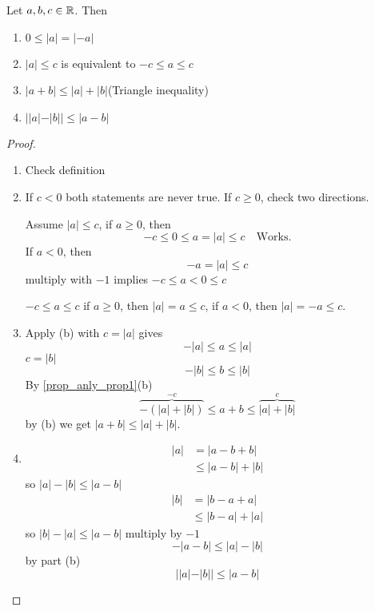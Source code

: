 \documentclass[10pt, a4paper]{article}
\begin{document}
\begin{proposition}\label{prop_anly_prop2}
    Let $a, b, c \in \mathbb{R}$. Then
    \begin{enumerate}[label = (\alph*)]
        \item $0 \leq |a| = |-a|$
        \item $|a| \leq c$ is equivalent to $-c \leq a \leq c$
        \item $|a + b| \leq |a| + |b|$\quad(Triangle inequality)
        \item $||a| - |b|| \leq |a - b|$
    \end{enumerate}

    \begin{proof}\phantom{}
    \begin{enumerate}[label = (\alph*)]
        \item Check definition
        \item 
        If $c < 0$ both statements are never true. If $c \geq 0$, check two directions.

        Assume $|a| \leq c$, if $a \geq 0$, then 
        \[
        -c \leq 0 \leq a = |a| \leq c\quad\text{Works}.
        \]
        If $a < 0$, then 
        \[
        -a = |a| \leq c
        \]
        multiply with $-1$ implies $-c \leq a < 0 \leq c$\quad{}

        $-c \leq a \leq c$ if $a \geq 0$, then $|a| = a \leq c$, if $a < 0$, then $|a| = -a \leq c$.

        \item
        Apply (b) with $c = |a|$ gives
        \[
        -|a| \leq a \leq |a|
        \]
        $c = |b|$
        \[
        -|b| \leq b \leq |b|
        \]
        By \autoref{prop_anly_prop1}(b)
        \[
        \overbrace{-(|a| + |b|)}^{-c} \leq a + b \leq \overbrace{|a| + |b|}^{c}
        \]
        by (b) we get $|a + b| \leq |a| + |b|$.

        \item
        \begin{align*}
            |a| &= |a - b + b| \\
            &\leq |a - b| + |b|
        \end{align*}
        so
        $|a| - |b| \leq |a - b|$
        \begin{align*}
            |b| &= |b - a + a| \\
            &\leq |b - a| + |a|
        \end{align*}
        so $|b| - |a| \leq |a - b|$ multiply by $-1$
        \[
        -|a - b| \leq |a| - |b|
        \]
        by part (b)
        \[
        ||a| - |b|| \leq |a - b|
        \]
    \end{enumerate}
    \end{proof}
\end{proposition}
\end{document}
